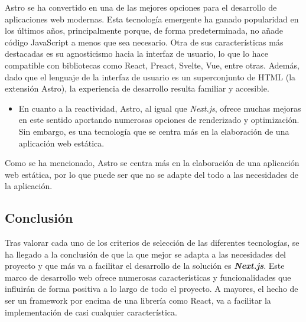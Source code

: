 Astro se ha convertido en una de las mejores opciones para el desarrollo de aplicaciones web modernas. Esta tecnología emergente ha ganado popularidad en los últimos años, principalmente porque, de forma predeterminada, no añade código JavaScript a menos que sea necesario. Otra de sus características más destacadas es su agnosticismo hacia la interfaz de usuario, lo que lo hace compatible con bibliotecas como React, Preact, Svelte, Vue, entre otras. Además, dado que el lenguaje de la interfaz de usuario es un superconjunto de HTML (la extensión Astro), la experiencia de desarrollo resulta familiar y accesible.

\begin{itemize}
  \item[\regular] En cuanto a la reactividad, Astro, al igual que \textit{Next.js}, ofrece muchas mejoras en este sentido aportando numerosas opciones de renderizado y optimización. Sin embargo, es una tecnología que se centra más en la elaboración de una aplicación web estática. 
\end{itemize}

Como se ha mencionado, Astro se centra más en la elaboración de una aplicación web estática, por lo que puede ser que no se adapte del todo a las necesidades de la aplicación.

\subsection{Conclusión}

Tras valorar cada uno de los criterios de selección de las diferentes tecnologías, se ha llegado a la conclusión de que la que mejor se adapta a las necesidades del proyecto y que más va a facilitar el desarrollo de la solución es \textbf{\textit{Next.js}}. Este marco de desarrollo web ofrece numerosas características y funcionalidades que influirán de forma positiva a lo largo de todo el proyecto. A mayores, el hecho de ser un framework por encima de una librería como React, va a facilitar la implementación de casi cualquier característica.